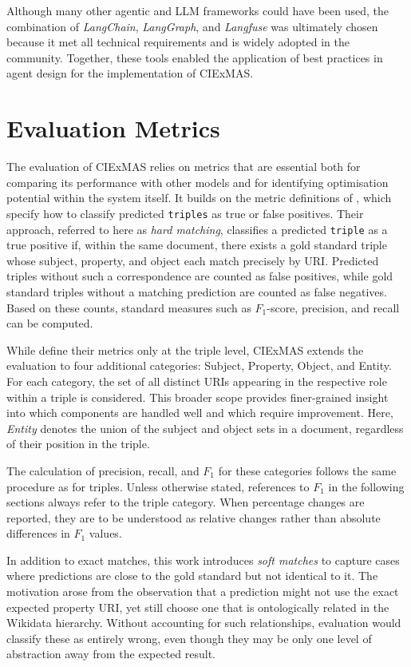 \documentclass[a4paper,oneside,bibliography=totoc]{scrbook}
\begin{document}
Although many other agentic and \ac{LLM} frameworks could have been used, the combination of \textit{LangChain}, \textit{LangGraph}, and \textit{Langfuse} was ultimately chosen because it met all technical requirements and is widely adopted in the community. Together, these tools enabled the application of best practices in agent design for the implementation of CIExMAS.

\section{Evaluation Metrics}
\label{sec:evaluation_metrics}

The evaluation of CIExMAS relies on metrics that are essential both for comparing its performance with other models and for identifying optimisation potential within the system itself. It builds on the metric definitions of \citet{Josifoski2021}, which specify how to classify predicted \texttt{triples} as true or false positives. Their approach, referred to here as \emph{hard matching}, classifies a predicted \texttt{triple} as a true positive if, within the same document, there exists a gold standard triple whose subject, property, and object each match precisely by \ac{URI}. Predicted triples without such a correspondence are counted as false positives, while gold standard triples without a matching prediction are counted as false negatives. Based on these counts, standard measures such as $F_1$-score, precision, and recall can be computed.

While \citet{Josifoski2021} define their metrics only at the triple level, CIExMAS extends the evaluation to four additional categories: Subject, Property, Object, and Entity. For each category, the set of all distinct \acp{URI} appearing in the respective role within a triple is considered. This broader scope provides finer-grained insight into which components are handled well and which require improvement. Here, \emph{Entity} denotes the union of the subject and object sets in a document, regardless of their position in the triple.

The calculation of precision, recall, and $F_1$ for these categories follows the same procedure as for triples. Unless otherwise stated, references to $F_1$ in the following sections always refer to the triple category. When percentage changes are reported, they are to be understood as relative changes rather than absolute differences in $F_1$ values.

In addition to exact matches, this work introduces \emph{soft matches} to capture cases where predictions are close to the gold standard but not identical to it. The motivation arose from the observation that a prediction might not use the exact expected property \ac{URI}, yet still choose one that is ontologically related in the Wikidata hierarchy. Without accounting for such relationships, evaluation would classify these as entirely wrong, even though they may be only one level of abstraction away from the expected result.
\end{document}
